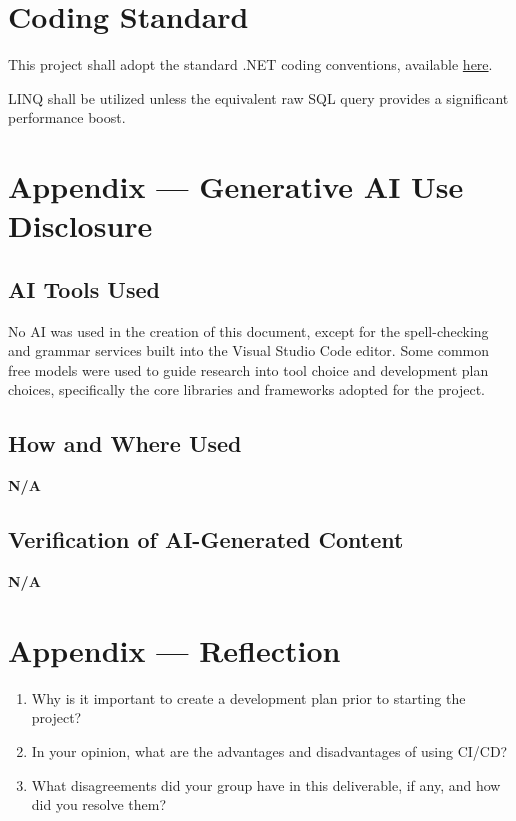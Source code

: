 \documentclass{article}
\begin{document}
\section{Coding Standard}


This project shall adopt the standard .NET coding conventions, available 
\href{https://learn.microsoft.com/en-us/dotnet/csharp/fundamentals/coding-style/coding-conventions}{here}. 

LINQ shall be utilized unless the equivalent raw SQL query provides a significant performance boost.

\newpage{}

\section{Appendix --- Generative AI Use Disclosure}


\subsection{AI Tools Used}

No AI was used in the creation of this document, except for the spell-checking and 
grammar services built into the Visual Studio Code editor. Some common free models were 
used to guide research into tool choice and development plan choices, specifically the 
core libraries and frameworks adopted for the project.

\subsection{How and Where Used}
\textbf{N/A}



\subsection{Verification of AI-Generated Content}
\textbf{N/A}

\section*{Appendix --- Reflection}

\begin{enumerate}
    \item Why is it important to create a development plan prior to starting the
    project?
    \item In your opinion, what are the advantages and disadvantages of using
    CI/CD?
    \item What disagreements did your group have in this deliverable, if any,
    and how did you resolve them?
\end{enumerate}
\end{document}
